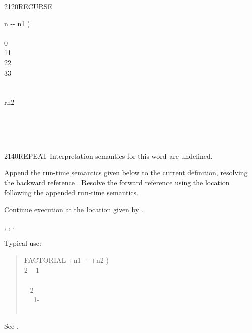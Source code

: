 \begin{worddef}{2120}{RECURSE}
\begin{testing}
		   n -{}- n1 ) \\
		\tab {}  \\
		\tab {} 0    \\
		  11    \\
		  22    \\
		  33    \\
		\tab[2]     \\
		\tab {} \\
		\word{;}  rn2

		 \\
		 \\
		 \\
	\end{testing}
\end{worddef}


\begin{worddef}{2140}{REPEAT}
\interpret
	Interpretation semantics for this word are undefined.

\compile

	Append the run-time semantics given below to the current
	definition, resolving the backward reference .
	Resolve the forward reference  using the location
	following the appended run-time semantics.

\runtime
	\stack{}{}

	Continue execution at the location given by .

\see {},
	,
	.

	\begin{rationale} %
		Typical use:
		\begin{quote}\ttfamily
			\word{:} FACTORIAL  +n1 -{}- +n2 ) \\
			\tab {} 2  ~
				 1 ~  \\
			\tab {} \\
			\tab {}~  2   \\
			\tab~~ 1- ~  \word{*}~  \\
			\tab {}  \\
			\word{;}
		\end{quote}
	\end{rationale}

	\begin{testing} %
		See .
	\end{testing}
\end{worddef}


